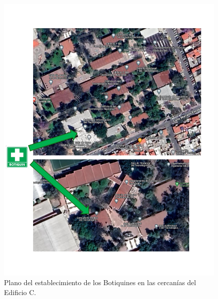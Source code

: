 \begin{figure}[H]
    \centering
    \includegraphics[trim = {0mm 25mm 0mm 12mm},clip,scale=0.3]{19/Img/planoLocalizadorBotiquin.pdf}
    \caption{Plano del establecimiento de los Botiquines en las cercanías del Edificio C.}
    \label{fig:planoLocalizadorBotiquin}
\end{figure}
